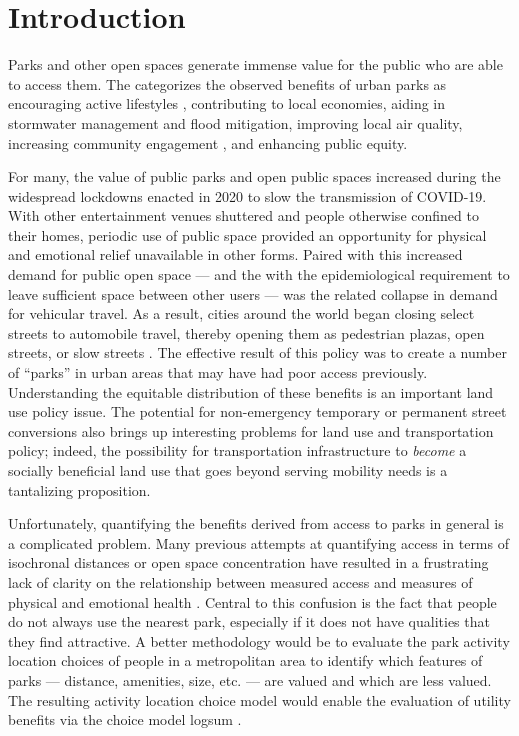 \documentclass[3p, authoryear, review]{elsarticle} %
\begin{document}
\hypertarget{intro}{%
\section{Introduction}\label{intro}}

Parks and other open spaces generate immense value for the public who are able
to access them. The \citet{CityParksAlliance} categorizes the observed benefits of
urban parks as encouraging active lifestyles \citep{Bancroft2015}, contributing to
local economies, aiding in stormwater management and flood mitigation, improving
local air quality, increasing community engagement \citep{Madzia2018}, and enhancing
public equity.

For many, the value of public parks and open public spaces increased during the
widespread lockdowns enacted in 2020 to slow the transmission of COVID-19. With
other entertainment venues shuttered and people otherwise confined to their
homes, periodic use of public space provided an opportunity for physical and
emotional relief unavailable in other forms. Paired with this increased demand
for public open space --- and the with the epidemiological requirement to leave
sufficient space between other users --- was the related collapse in demand for
vehicular travel. As a result, cities around the world began closing select
streets to automobile travel, thereby opening them as pedestrian plazas, open
streets, or slow streets \citep{glaser_can_2021, schlossberg_rethinking_2021, combs2021shifting}. The effective result of this policy was to create a number
of ``parks'' in urban areas that may have had poor access previously.
Understanding the equitable distribution of these benefits is an important land
use policy issue. The potential for non-emergency temporary or permanent street
conversions also brings up interesting problems for land use and transportation
policy; indeed, the possibility for transportation infrastructure to \emph{become} a
socially beneficial land use that goes beyond serving mobility needs is a
tantalizing proposition.

Unfortunately, quantifying the benefits derived from access to parks in general
is a complicated problem. Many previous attempts at quantifying access in terms
of isochronal distances or open space concentration have resulted in a
frustrating lack of clarity on the relationship between measured access and
measures of physical and emotional health \citep{Bancroft2015}. Central to this
confusion is the fact that people do not always use the nearest park, especially
if it does not have qualities that they find attractive. A better methodology
would be to evaluate the park activity location choices of people in a
metropolitan area to identify which features of parks --- distance, amenities,
size, etc. --- are valued and which are less valued. The resulting activity
location choice model would enable the evaluation of utility benefits via the
choice model logsum \citep{Handy1997, DeJong2007}.
\end{document}
